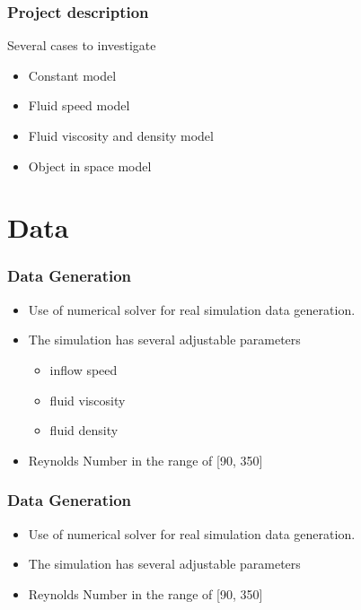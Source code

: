 \documentclass[18pt]{beamer}
\begin{document}
\begin{frame}[t]
  \frametitle{Project description}
  \large{Several cases to investigate}
  \begin{itemize}
  \item Constant model
  \item Fluid speed model
  \item Fluid viscosity and density model
  \item Object in space model
  \end{itemize}
  
\end{frame}

\section{Data}
\begin{frame}[t]
  \frametitle{Data Generation}
  \begin{itemize}
  \item Use of numerical solver for real simulation data generation.
  \item The simulation has several adjustable parameters
    \begin{itemize}
    \item inflow speed
    \item fluid viscosity
    \item fluid density
    \end{itemize}
  \item Reynolds Number in the range of [90, 350]
  \end{itemize}  
\end{frame}

\begin{frame}[t]
  \frametitle{Data Generation}
  \begin{itemize}
  \item Use of numerical solver for real simulation data generation.
  \item The simulation has several adjustable parameters
  \item Reynolds Number in the range of [90, 350]
  \end{itemize}
\end{frame}
\end{document}
